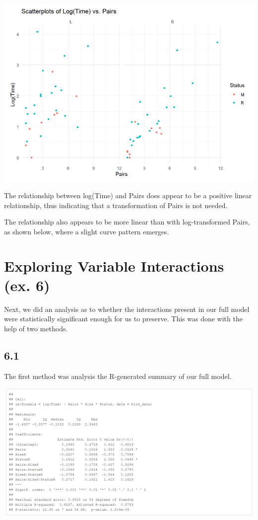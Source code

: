 \documentclass{article}
\begin{document}
\begin{center}
\includegraphics[scale=0.5]{graphs/graph5.png}
\end{center}

The relationship between log(Time) and Pairs does appear to be a positive linear relationship, thus indicating that a transformation of Pairs is not needed.

The relationship also appears to be more linear than with log-transformed Pairs, as shown below, where a slight curve pattern emerges.



\section{Exploring Variable Interactions (ex. 6)}

Next, we did an analysis as to whether the interactions present in our full model were statistically significant enough for us to preserve. This was done with the help of two methods.

\subsection*{6.1}
The first method was analysis the R-generated summary of our full model.
\begin{center}
\includegraphics[scale=0.5]{tables/log-time.png}
\end{center}
\end{document}
